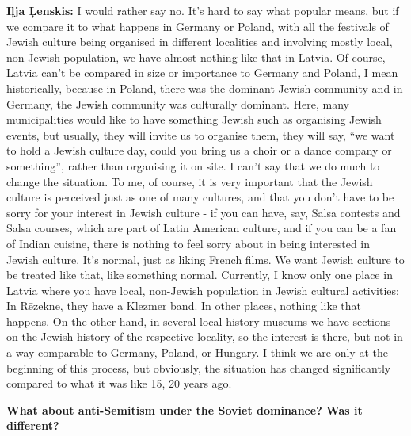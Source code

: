 \textbf{Iļja Ļenskis:} I would rather say no. It’s hard to say what popular means, but if we compare it to what happens in Germany or Poland, with all the festivals of Jewish culture being organised in different localities and involving mostly local, non-Jewish population, we have almost nothing like that in Latvia. Of course, Latvia can’t be compared in size or importance to Germany and Poland, I mean historically, because in Poland, there was the dominant Jewish community and in Germany, the Jewish community was culturally dominant. Here, many municipalities would like to have something Jewish such as organising Jewish events, but usually, they will invite us to organise them, they will say, ``we want to hold a Jewish culture day, could you bring us a choir or a dance company or something'', rather than organising it on site. I can’t say that we do much to change the situation. To me, of course, it is very important that the Jewish culture is perceived just as one of many cultures, and that you don’t have to be sorry for your interest in Jewish culture - if you can have, say, Salsa contests and Salsa courses, which are part of Latin American culture, and if you can be a fan of Indian cuisine, there is nothing to feel sorry about in being interested in Jewish culture. It's normal, just as liking French films. We want Jewish culture to be treated like that, like something normal. Currently, I know only one place in Latvia where you have local, non-Jewish population in Jewish cultural activities: In Rēzekne, they have a Klezmer band. In other places, nothing like that happens. On the other hand, in several local history museums we have sections on the Jewish history of the respective locality, so the interest is there, but not in a way comparable to Germany, Poland, or Hungary. I think we are only at the beginning of this process, but obviously, the situation has changed significantly compared to what it was like 15, 20 years ago. 

\textbf{What about anti-Semitism under the Soviet dominance? Was it different?}

